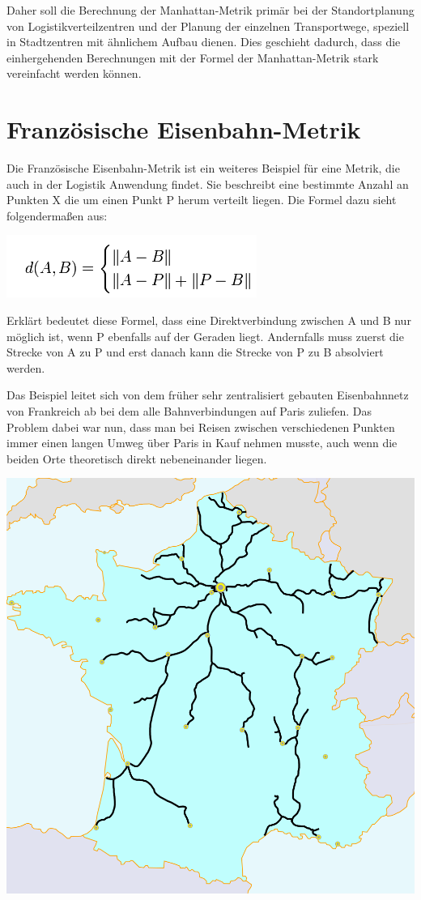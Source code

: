 \documentclass[a4paper,12pt]{scrreprt}
\begin{document}
	
	Daher soll die Berechnung der Manhattan-Metrik primär bei der Standortplanung von Logistikverteilzentren und der Planung der einzelnen Transportwege, speziell in Stadtzentren mit ähnlichem Aufbau dienen. Dies geschieht dadurch, dass die einhergehenden Berechnungen mit der Formel der Manhattan-Metrik stark vereinfacht werden können. 
	
	\section{Französische Eisenbahn-Metrik}
	Die Französische Eisenbahn-Metrik ist ein weiteres Beispiel für eine Metrik, die auch in der Logistik Anwendung findet. Sie beschreibt eine bestimmte Anzahl an Punkten X die um einen Punkt P herum verteilt liegen. Die Formel dazu sieht folgendermaßen aus:
	\begin{center}
	\includegraphics[width=0.7\linewidth]{./Bilder/Formel_Franzoesische_Eisenbahnmetrik}
	\end{center}
			
		Erklärt bedeutet diese Formel, dass eine Direktverbindung zwischen A und B nur möglich ist, wenn P ebenfalls auf der Geraden liegt. Andernfalls muss zuerst die Strecke von A zu P und erst danach kann die Strecke von P zu B absolviert werden.
		
		Das Beispiel leitet sich von dem früher sehr zentralisiert gebauten Eisenbahnnetz von Frankreich ab bei dem alle Bahnverbindungen auf Paris zuliefen.
		Das Problem dabei war nun, dass man bei Reisen zwischen verschiedenen Punkten immer einen langen Umweg über Paris in Kauf nehmen musste, auch wenn die beiden Orte theoretisch direkt nebeneinander liegen.
		\begin{center}
		\includegraphics[width=0.6\linewidth]{./Bilder/french_railway}
		\end{center}
	
\end{document}
